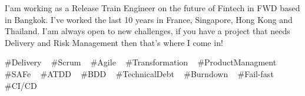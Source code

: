 

\begin{cvparagraph}


I'am working as a Release Train Engineer on the future of Fintech in FWD based in Bangkok.
I’ve worked the last 10 years in France, Singapore, Hong Kong and Thailand.
I'am always open to new challenges, if you have a project that needs Delivery and Risk Management then that’s where I come in!


\end{cvparagraph}
\begin{cvtechnologies}
 \#Delivery  ~
 \#Scrum ~
 \#Agile ~
 \#Transformation ~
 \#ProductManagment ~
 \#SAFe ~
 \#ATDD ~
 \#BDD ~
 \#TechnicalDebt ~
 \#Burndown ~
 \#Fail-fast ~
 \#CI/CD ~
\end{cvtechnologies}
